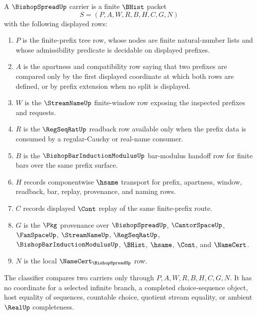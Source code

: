 \begin{definition}
\label{def:bishop-spread-carrier}
A $\BishopSpreadUp$ carrier is a finite $\BHist$ packet
$$
S=(P,A,W,R,B,H,C,G,N)
$$
with the following displayed rows:
\begin{enumerate}
  \item $P$ is the finite-prefix tree row, whose nodes are finite natural-number lists and whose admissibility predicate is decidable on displayed prefixes.
  \item $A$ is the apartness and compatibility row saying that two prefixes are compared only by the first displayed coordinate at which both rows are defined, or by prefix extension when no split is displayed.
  \item $W$ is the $\StreamNameUp$ finite-window row exposing the inspected prefixes and requests.
  \item $R$ is the $\RegSeqRatUp$ readback row available only when the prefix data is consumed by a regular-Cauchy or real-name consumer.
  \item $B$ is the $\BishopBarInductionModulusUp$ bar-modulus handoff row for finite bars over the same prefix surface.
  \item $H$ records componentwise $\hsame$ transport for prefix, apartness, window, readback, bar, replay, provenance, and naming rows.
  \item $C$ records displayed $\Cont$ replay of the same finite-prefix route.
  \item $G$ is the $\Pkg$ provenance over $\BishopSpreadUp$, $\CantorSpaceUp$, $\FanSpaceUp$, $\StreamNameUp$, $\RegSeqRatUp$, $\BishopBarInductionModulusUp$, $\BHist$, $\hsame$, $\Cont$, and $\NameCert$.
  \item $N$ is the local $\NameCert_{\BishopSpreadUp}$ row.
\end{enumerate}
The classifier compares two carriers only through $P,A,W,R,B,H,C,G,N$. It has no coordinate for a selected infinite branch, a completed choice-sequence object, host equality of sequences, countable choice, quotient stream equality, or ambient $\RealUp$ completeness.
\end{definition}

